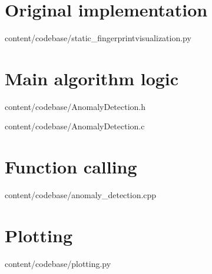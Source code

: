 \section{Original implementation}

{content/codebase/static_fingerprintvisualization.py}

\section{Main algorithm logic}

{content/codebase/AnomalyDetection.h}

{content/codebase/AnomalyDetection.c}

\section{Function calling}

{content/codebase/anomaly_detection.cpp}

\section{Plotting}

{content/codebase/plotting.py}

